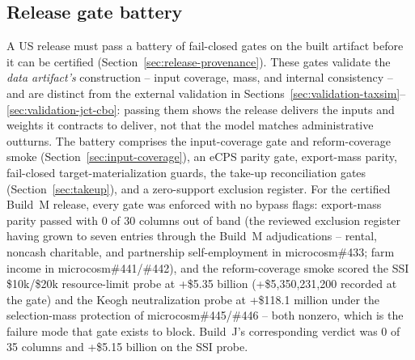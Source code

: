 
\subsection{Release gate battery}
\label{sec:release-gates}

A \microcosm{} US release must pass a battery of fail-closed gates on the
built artifact before it can be certified
(Section~\ref{sec:release-provenance}). These gates validate the
\emph{data artifact's} construction -- input coverage, mass, and internal
consistency -- and are distinct from the external validation in
Sections~\ref{sec:validation-taxsim}--\ref{sec:validation-jct-cbo}:
passing them shows the release delivers the inputs and weights it
contracts to deliver, not that the model matches administrative outturns.
The battery comprises the input-coverage gate and reform-coverage smoke
(Section~\ref{sec:input-coverage}), an eCPS parity gate, export-mass
parity, fail-closed target-materialization guards, the take-up
reconciliation gates (Section~\ref{sec:takeup}), and a zero-support
exclusion register. For the certified Build~M release, every gate was
enforced with no bypass flags: export-mass parity passed with 0 of 30
columns out of band (the reviewed exclusion register having grown to
seven entries through the Build~M adjudications -- rental, noncash
charitable, and partnership self-employment in microcosm\#433; farm income
in microcosm\#441/\#442), and the reform-coverage smoke scored the SSI
\$10k/\$20k resource-limit probe at +\$5.35 billion
(+\$5{,}350{,}231{,}200 recorded at the gate) and the Keogh
neutralization probe at +\$118.1 million under the selection-mass
protection of microcosm\#445/\#446 -- both nonzero, which is the failure
mode that gate exists to block. Build~J's corresponding verdict was
0 of 35 columns and +\$5.15 billion on the SSI probe.

